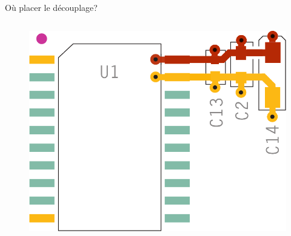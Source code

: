 \begin{frame}{Où placer le découplage?}
\begin{columns}
        \begin{column}{0.3\textwidth}
                \begin{figure}
                    \includegraphics[width=\textwidth, height=0.66\textheight, keepaspectratio]{pictures/decoupling-placement.png}
                \end{figure}
        \end{column}
    \end{columns}
\end{frame}


